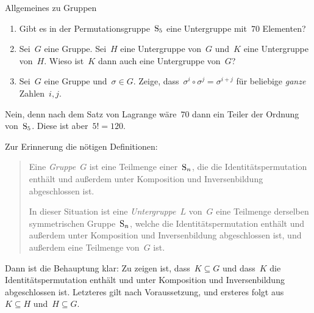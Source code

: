 \documentclass{algblatt}
\begin{document}
\vspace*{-1.5cm}

\begin{aufgabe}{Allgemeines zu Gruppen}
\begin{enumerate}
\item Gibt es in der Permutationsgruppe~$\mathrm{S}_5$ eine Untergruppe mit~$70$
Elementen?

\item Sei~$G$ eine Gruppe. Sei~$H$ eine Untergruppe von~$G$ und~$K$ eine
Untergruppe von~$H$. Wieso ist~$K$ dann auch eine Untergruppe von~$G$?

\item Sei~$G$ eine Gruppe und~$\sigma \in G$. Zeige, dass~$\sigma^i \circ
\sigma^j = \sigma^{i + j}$ für beliebige \emph{ganze} Zahlen~$i,j$.
\end{enumerate}

\begin{loesungE}
\item Nein, denn nach dem Satz von Lagrange wäre~$70$ dann ein Teiler der
Ordnung von~$\mathrm{S}_5$. Diese ist aber~$5! = 120$.

\item Zur Erinnerung die nötigen Definitionen:
\begin{quote}
  Eine \emph{Gruppe}~$G$ ist eine Teilmenge einer~$\mathrm{S}_n$, die die
  Identitätspermutation enthält und außerdem unter
  Komposition und Inversenbildung abgeschlossen ist.

  In dieser Situation ist eine \emph{Untergruppe}~$L$ von~$G$ eine
  Teilmenge derselben symmetrischen Gruppe~$\mathrm{S}_n$, welche die 
  Identitätspermutation enthält und außerdem unter
  Komposition und Inversenbildung abgeschlossen ist, und außerdem eine
  Teilmenge von~$G$ ist.
\end{quote}
Dann ist die Behauptung klar: Zu zeigen ist, dass~$K \subseteq G$ und dass~$K$
die Identitätspermutation enthält und unter Komposition und Inversenbildung
abgeschlossen ist. Letzteres gilt nach Voraussetzung, und ersteres folgt aus~$K
\subseteq H$ und~$H \subseteq G$.


\end{loesungE}
\end{aufgabe}
\end{document}
